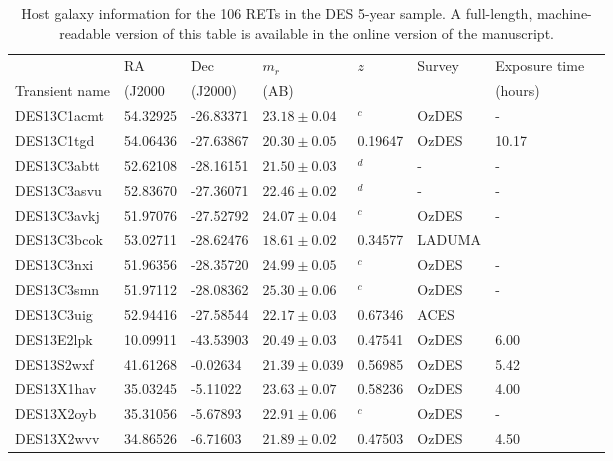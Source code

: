 \documentclass[fleqn,usenatbib,]{mnras}
\begin{document}
\begin{table}
\caption{Host galaxy information for the 106 RETs in the DES 5-year sample. A full-length, machine-readable version of this table is available in the online version of the manuscript.}

\begin{threeparttable}
\begin{tabular}{llllllll}

\toprule
{} &       RA &       Dec &    $m_r$\tnote{a}  &     $z$ &     Survey & Exposure time \tnote{b} \\
Transient name &  (J2000  & (J2000)  &  (AB)    &         &         &   (hours)         &               \\
\midrule
DES13C1acmt    & 54.32925 & -26.83371 & $23.18 \pm 0.04$ &    $^c$ &      OzDES &             - \\
DES13C1tgd     & 54.06436 & -27.63867 & $20.30 \pm 0.05$ & 0.19647 &      OzDES &      10.17 \\
DES13C3abtt    & 52.62108 & -28.16151 & $21.50 \pm 0.03$ &    $^d$ &          - &             - \\
DES13C3asvu    & 52.83670 & -27.36071 & $22.46 \pm 0.02$ &    $^d$ &          - &             - \\
DES13C3avkj    & 51.97076 & -27.52792 & $24.07 \pm 0.04$ &    $^c$ &      OzDES &             - \\
DES13C3bcok    & 53.02711 & -28.62476 & $18.61 \pm 0.02$ & 0.34577 &  LADUMA &               \\
DES13C3nxi     & 51.96356 & -28.35720 & $24.99 \pm 0.05$ &    $^c$ &      OzDES &             - \\
DES13C3smn     & 51.97112 & -28.08362 & $25.30 \pm 0.06$ &    $^c$ &      OzDES &             - \\
DES13C3uig     & 52.94416 & -27.58544 & $22.17 \pm 0.03$ & 0.67346 &       ACES &               \\
DES13E2lpk     & 10.09911 & -43.53903 & $20.49 \pm 0.03$ & 0.47541 &      OzDES &       6.00 \\
DES13S2wxf\tnote{e}& 41.61268 & -0.02634&$21.39 \pm0.03$9& 0.56985 &      OzDES &       5.42 \\
DES13X1hav     & 35.03245 &  -5.11022 & $23.63 \pm 0.07$ & 0.58236 &      OzDES &       4.00 \\
DES13X2oyb     & 35.31056 &  -5.67893 & $22.91 \pm 0.06$ &    $^c$ &      OzDES &             - \\
DES13X2wvv\tnote{e}     & 34.86526 &  -6.71603 & $21.89 \pm 0.02$ & 0.47503 &      OzDES &       4.50 \\

\end{tabular}
\end{threeparttable}
\end{table}
\end{document}
